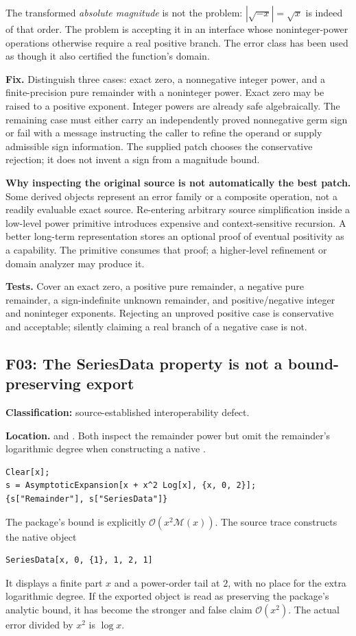 \documentclass[11pt,letterpaper]{article}
\newcommand{\code}[1]{\texttt{\small\detokenize{#1}}}
\newcommand{\OO}{\mathcal O}
\newcommand{\M}{\mathcal M}
\newcommand{\finding}[3]{\Needspace{8\baselineskip}\subsection{#1: #2}\noindent\textbf{Classification:} #3.\par}
\begin{document}
The transformed \emph{absolute magnitude} is not the problem: $|\sqrt{-x}|=\sqrt{x}$ is indeed of that order. The problem is accepting it in an interface whose noninteger-power operations otherwise require a real positive branch. The error class has been used as though it also certified the function's domain.

\textbf{Fix.} Distinguish three cases: exact zero, a nonnegative integer power, and a finite-precision pure remainder with a noninteger power. Exact zero may be raised to a positive exponent. Integer powers are already safe algebraically. The remaining case must either carry an independently proved nonnegative germ sign or fail with a message instructing the caller to refine the operand or supply admissible sign information. The supplied patch chooses the conservative rejection; it does not invent a sign from a magnitude bound.

\textbf{Why inspecting the original source is not automatically the best patch.} Some derived objects represent an error family or a composite operation, not a readily evaluable exact source. Re-entering arbitrary source simplification inside a low-level power primitive introduces expensive and context-sensitive recursion. A better long-term representation stores an optional proof of eventual positivity as a capability. The primitive consumes that proof; a higher-level refinement or domain analyzer may produce it.

\textbf{Tests.} Cover an exact zero, a positive pure remainder, a negative pure remainder, a sign-indefinite unknown remainder, and positive/negative integer and noninteger exponents. Rejecting an unproved positive case is conservative and acceptable; silently claiming a real branch of a negative case is not.

\finding{F03}{The SeriesData property is not a bound-preserving export}{source-established interoperability defect}
\label{sec:f03}
\textbf{Location.} \code{makeSeriesData} and \code{makeInverseSeriesData}. Both inspect the remainder power but omit the remainder's logarithmic degree when constructing a native \code{SeriesData}.\cite{repo-core}

\begin{lstlisting}
Clear[x];
s = AsymptoticExpansion[x + x^2 Log[x], {x, 0, 2}];
{s["Remainder"], s["SeriesData"]}
\end{lstlisting}
The package's bound is explicitly $\OO(x^2\M(x))$. The source trace constructs the native object
\begin{lstlisting}
SeriesData[x, 0, {1}, 1, 2, 1]
\end{lstlisting}
It displays a finite part $x$ and a power-order tail at $2$, with no place for the extra logarithmic degree. If the exported object is read as preserving the package's analytic bound, it has become the stronger and false claim $\OO(x^2)$. The actual error divided by $x^2$ is $\log x$.
\end{document}
